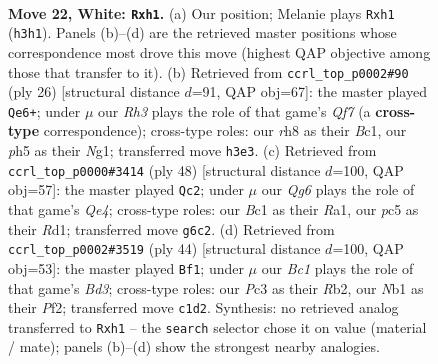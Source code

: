 \documentclass[11pt]{article}
\begin{document}
\clearpage

\begin{figure}[p]\centering
\begin{subfigure}{0.46\textwidth}\centering
\resizebox{\linewidth}{!}{%
\newchessgame
\chessboard[
  setfen={3k2nr/2r3p1/pq1b2Q1/2p3Pp/5P1P/2P4R/PP6/RNB1K2b w Q - 0 22},
  showmover=false,
  pgfstyle=straightmove, color=movearrow, markmove={h3-h1}
]}
\caption{}
\end{subfigure}\hfill
\begin{subfigure}{0.46\textwidth}\centering
\resizebox{\linewidth}{!}{%
\newchessgame
\chessboard[
  setfen={2kr1bnr/pp3Q2/6p1/2p1P3/4b2q/2Pp2N1/PP1P2PP/R1B1K1NR w KQ - 0 14},
  showmover=false,
  pgfstyle=straightmove, color=movearrow, markmove={f7-e6}
]}
\caption{}
\end{subfigure}
\\[4pt]
\begin{subfigure}{0.46\textwidth}\centering
\resizebox{\linewidth}{!}{%
\newchessgame
\chessboard[
  setfen={r2r2k1/p5p1/p1b1qp1p/4p3/4Q3/P1B1P2P/1P3PP1/R2R2K1 w - - 3 25},
  showmover=false,
  pgfstyle=straightmove, color=movearrow, markmove={e4-c2}
]}
\caption{}
\end{subfigure}\hfill
\begin{subfigure}{0.46\textwidth}\centering
\resizebox{\linewidth}{!}{%
\newchessgame
\chessboard[
  setfen={4r1k1/ppq2p1p/6p1/3Pr3/b1P5/3B2Q1/PR3PP1/R5K1 w - - 5 23},
  showmover=false,
  pgfstyle=straightmove, color=movearrow, markmove={d3-f1}
]}
\caption{}
\end{subfigure}
\caption{\textbf{Move 22, White: \texttt{Rxh1}.} (a) Our position; Melanie plays \texttt{Rxh1} (\texttt{h3h1}). Panels (b)--(d) are the retrieved master positions whose correspondence most drove this move (highest QAP objective among those that transfer to it). (b) Retrieved from \texttt{ccrl\_top\_p0002\#90} (ply 26) [structural distance $d$=91, QAP obj=67]: the master played \texttt{Qe6+}; under $\mu$ our \emph{Rh3} plays the role of that game's \emph{Qf7} (a \textbf{cross-type} correspondence); cross-type roles: our \emph{r}h8 as their \emph{B}c1, our \emph{p}h5 as their \emph{N}g1; transferred move \texttt{h3e3}. (c) Retrieved from \texttt{ccrl\_top\_p0000\#3414} (ply 48) [structural distance $d$=100, QAP obj=57]: the master played \texttt{Qc2}; under $\mu$ our \emph{Qg6} plays the role of that game's \emph{Qe4}; cross-type roles: our \emph{B}c1 as their \emph{R}a1, our \emph{p}c5 as their \emph{R}d1; transferred move \texttt{g6c2}. (d) Retrieved from \texttt{ccrl\_top\_p0002\#3519} (ply 44) [structural distance $d$=100, QAP obj=53]: the master played \texttt{Bf1}; under $\mu$ our \emph{Bc1} plays the role of that game's \emph{Bd3}; cross-type roles: our \emph{P}c3 as their \emph{R}b2, our \emph{N}b1 as their \emph{P}f2; transferred move \texttt{c1d2}. Synthesis: no retrieved analog transferred to \texttt{Rxh1} -- the \texttt{search} selector chose it on value (material / mate); panels (b)--(d) show the strongest nearby analogies.}
\label{fig:thought-m42}
\end{figure}
\end{document}
